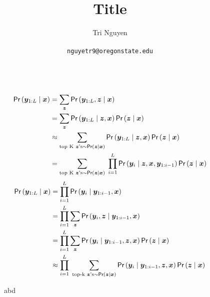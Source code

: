 \documentclass[11pt,a4paper]{article}
\title{Title}
\author{	Tri Nguyen \\\\
        \texttt{nguyetr9@oregonstate.edu} \\\\
        }
\begin{document}
\maketitle

\begin{figure}[ht]
    \centering
    \label{fig:model1}
\end{figure}
\begin{align*}
    \textsf{Pr}\left(\bm{y}_{1:L} \mid \bm{x}\right)
    &= \sum_{\bm{z}}  \textsf{Pr}\left(\bm{y}_{1:L}, \bm{z} \mid \bm{x}\right) \\
    &= \sum_{\bm{z}}  \textsf{Pr}\left(\bm{y}_{1:L} \mid \bm{z}, \bm{x}\right) \textsf{Pr}\left(\bm{z} \mid \bm{x}\right) \\
    &\approx \sum_{\text{top K $\bm{z}$'s}  \sim \textsf{Pr}\left(\bm{z} \mid \bm{x}\right)}  \textsf{Pr}\left(\bm{y}_{1:L} \mid \bm{z}, \bm{x}\right) \textsf{Pr}\left(\bm{z} \mid \bm{x}\right) \\
    &= \sum_{\text{top K $\bm{z}$'s}  \sim \textsf{Pr}\left(\bm{z} \mid \bm{x}\right)} \; \prod_{i=1}^{L} \textsf{Pr}\left(\bm{y}_{i} \mid \bm{z}, \bm{x}, \bm{y}_{1:i-1}\right) \textsf{Pr}\left(\bm{z} \mid \bm{x}\right)
\end{align*}
\begin{align*}
    \textsf{Pr}\left(\bm{y}_{1:L} \mid \bm{x}\right)
    &= \prod_{i=1}^{L} \textsf{Pr}\left(\bm{y}_{i} \mid \bm{y}_{1:i-1},\bm{x}\right) \\
    &= \prod_{i=1}^{L} \sum_{\bm{z}}  \textsf{Pr}\left(\bm{y}_{i}, \bm{z} \mid \bm{y}_{1:i-1}, \bm{x}\right) \\
    &= \prod_{i=1}^{L} \sum_{\bm{z}}  \textsf{Pr}\left(\bm{y}_{i} \mid \bm{y}_{1:i-1}, \bm{z}, \bm{x}\right) \textsf{Pr}\left(\bm{z} \mid \bm{x}\right) \\
    &\approx \prod_{i=1}^{L} \; \sum_{\text{top-k $\bm{z}$'s} \sim \textsf{Pr}\left(\bm{z} \mid \bm{x}\right)}  \textsf{Pr}\left(\bm{y}_{i} \mid \bm{y}_{1:i-1}, \bm{z}, \bm{x}\right) \textsf{Pr}\left(\bm{z} \mid \bm{x}\right) \\
\end{align*}

\begin{figure}[ht]
    \centering
    \caption{abd}
    \label{fig:abd}
\end{figure}
\end{document}
